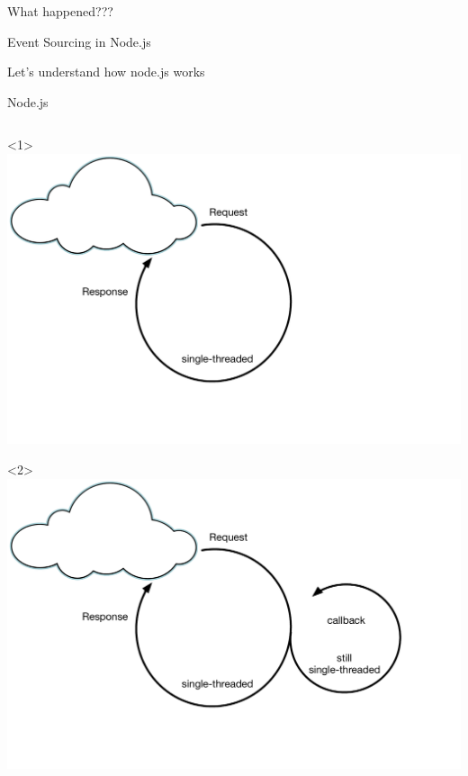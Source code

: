 \begin{frame}[fragile]{}

\begin{center}
\Huge
What happened???
\end{center}

\end{frame}

\begin{frame}[fragile]{Event Sourcing in Node.js}

Let's understand how node.js works

\end{frame}

\begin{frame}[fragile]{Node.js}

\renewcommand{\WIDTH}{\textwidth}

\begin{columns}[T] %
\begin{column}{.7\textwidth}
\begin{onlyenv}<1>
\includegraphics[width=\WIDTH]{../Nodejs1.pdf}
\end{onlyenv}

\begin{onlyenv}<2>
\includegraphics[width=\WIDTH]{../Nodejs2.pdf}
\end{onlyenv}


\end{column}
\end{columns}
\end{frame}
